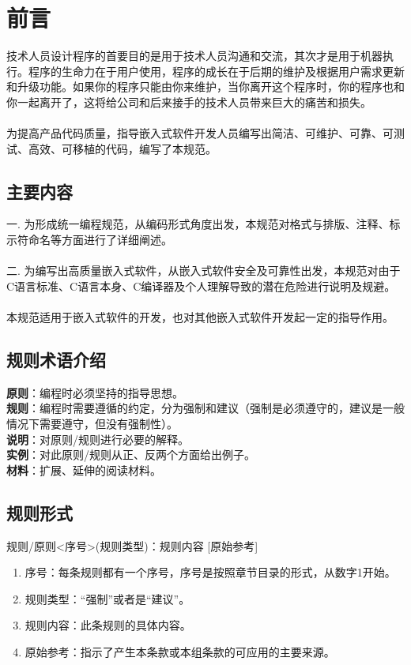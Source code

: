 \section{前言}
技术人员设计程序的首要目的是用于技术人员沟通和交流，其次才是用于机器执行。程序的生命力在于用户使用，程序的成长在于后期的维护及根据用户需求更新和升级功能。如果你的程序只能由你来维护，当你离开这个程序时，你的程序也和你一起离开了，这将给公司和后来接手的技术人员带来巨大的痛苦和损失。\\
\\
为提高产品代码质量，指导嵌入式软件开发人员编写出简洁、可维护、可靠、可测试、高效、可移植的代码，编写了本规范。\\

\subsection{主要内容}
一. 为形成统一编程规范，从编码形式角度出发，本规范对格式与排版、注释、标示符命名等方面进行了详细阐述。\\
\\
二. 为编写出高质量嵌入式软件，从嵌入式软件安全及可靠性出发，本规范对由于C语言标准、C语言本身、C编译器及个人理解导致的潜在危险进行说明及规避。\\
\\
本规范适用于嵌入式软件的开发，也对其他嵌入式软件开发起一定的指导作用。\\
	
\subsection{规则术语介绍}
\textbf{原则}：编程时必须坚持的指导思想。\\
\textbf{规则}：编程时需要遵循的约定，分为强制和建议（强制是必须遵守的，建议是一般情况下需要遵守，但没有强制性）。\\
\textbf{说明}：对原则/规则进行必要的解释。\\
\textbf{实例}：对此原则/规则从正、反两个方面给出例子。\\
\textbf{材料}：扩展、延伸的阅读材料。\\

\subsection{规则形式}
\centerline{规则/原则<序号>(规则类型)：规则内容 [原始参考]}
\begin{enumerate}
\item 序号：每条规则都有一个序号，序号是按照章节目录的形式，从数字1开始。
\item 规则类型：“强制”或者是“建议”。
\item 规则内容：此条规则的具体内容。
\item 原始参考：指示了产生本条款或本组条款的可应用的主要来源。
\end{enumerate}

